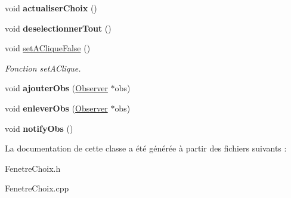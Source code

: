 \begin{DoxyCompactItemize}
\item 
\hypertarget{classFenetreChoix_a870f277efcd181d452893ecb05a8e5dc}{void {\bfseries actualiser\-Choix} ()}\label{classFenetreChoix_a870f277efcd181d452893ecb05a8e5dc}

\item 
\hypertarget{classFenetreChoix_ac26f3803e0d74d50e979f26061a607d0}{void {\bfseries deselectionner\-Tout} ()}\label{classFenetreChoix_ac26f3803e0d74d50e979f26061a607d0}

\item 
\hypertarget{classFenetreChoix_a7b3cb058960b8c32d02cceaacf0c7d36}{void \hyperlink{classFenetreChoix_a7b3cb058960b8c32d02cceaacf0c7d36}{set\-A\-Clique\-False} ()}\label{classFenetreChoix_a7b3cb058960b8c32d02cceaacf0c7d36}

\begin{DoxyCompactList}\small\item\em \-Fonction set\-A\-Clique. \end{DoxyCompactList}\item 
\hypertarget{classFenetreChoix_a0c446ed2571d5dccc8b2665e6fcbbaee}{void {\bfseries ajouter\-Obs} (\hyperlink{classObserver}{\-Observer} $\ast$obs)}\label{classFenetreChoix_a0c446ed2571d5dccc8b2665e6fcbbaee}

\item 
\hypertarget{classFenetreChoix_a0ac736f8823d42629849d08ad39f5a60}{void {\bfseries enlever\-Obs} (\hyperlink{classObserver}{\-Observer} $\ast$obs)}\label{classFenetreChoix_a0ac736f8823d42629849d08ad39f5a60}

\item 
\hypertarget{classFenetreChoix_a85b717a64d5878f4f1178addbadcd644}{void {\bfseries notify\-Obs} ()}\label{classFenetreChoix_a85b717a64d5878f4f1178addbadcd644}

\end{DoxyCompactItemize}


\-La documentation de cette classe a été générée à partir des fichiers suivants \-:\begin{DoxyCompactItemize}
\item 
\-Fenetre\-Choix.\-h\item 
\-Fenetre\-Choix.\-cpp\end{DoxyCompactItemize}
